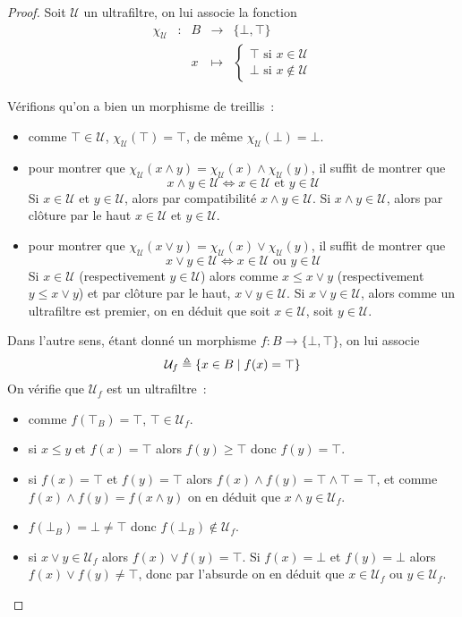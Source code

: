 \begin{proof}
  Soit $\mathcal U$ un ultrafiltre, on lui associe la fonction
  \[\begin{array}{ccccc}
  \chi_{\mathcal U} & : & B & \longrightarrow & \{\bot,\top\}\\
  & & x &\longmapsto& \begin{cases}
    \top\text{ si } x\in \mathcal U\\
    \bot\text{ si } x\notin\mathcal U
  \end{cases}
  \end{array}\]

  Vérifions qu'on a bien un morphisme de treillis~:
  \begin{itemize}
  \item comme $\top\in\mathcal U$, $\chi_\mathcal U(\top) = \top$, de même
    $\chi_\mathcal U(\bot) = \bot$.
  \item pour montrer que
    $\chi_\mathcal U(x\land y) = \chi_\mathcal U(x)\land\chi_\mathcal U(y)$, il
    suffit de montrer que
    \[x\land y \in \mathcal U \iff x\in\mathcal U \text{ et }y\in\mathcal U\]
    Si $x\in \mathcal U$ et $y\in\mathcal U$, alors par compatibilité
    $x\land y \in \mathcal U$. Si $x\land y \in \mathcal U$, alors par clôture
    par le haut $x\in \mathcal U$ et $y\in \mathcal U$.
  \item pour montrer que
    $\chi_\mathcal U(x\lor y) = \chi_\mathcal U(x)\lor\chi_\mathcal U(y)$, il
    suffit de montrer que
    \[x\lor y \in \mathcal U \iff x\in\mathcal U \text{ ou }y\in\mathcal U\]
    Si $x\in \mathcal U$ (respectivement $y\in \mathcal U$) alors comme
    $x\leq x\lor y$ (respectivement $y\leq x\lor y$) et par clôture par le haut,
    $x\lor y \in \mathcal U$. Si $x\lor y \in \mathcal U$, alors comme un
    ultrafiltre est premier, on en déduit que soit $x\in\mathcal U$, soit
    $y\in \mathcal U$.
  \end{itemize}

  Dans l'autre sens, étant donné un morphisme $f : B \to \{\bot,\top\}$, on lui
  associe
  \[\mathcal U_f \triangleq \{x\in B \mid f(x) = \top\}\]
  On vérifie que $\mathcal U_f$ est un ultrafiltre~:
  \begin{itemize}
  \item comme $f(\top_B) = \top$, $\top\in \mathcal U_f$.
  \item si $x\leq y$ et $f(x)=\top$ alors $f(y)\geq \top$ donc $f(y)=\top$.
  \item si $f(x) = \top$ et $f(y)=\top$ alors
    $f(x)\land f(y) = \top\land\top =\top$, et comme
    $f(x)\land f(y)=f(x\land y)$ on en déduit que $x\land y \in \mathcal U_f$.
  \item $f(\bot_B)=\bot\neq\top$ donc $f(\bot_B)\notin\mathcal U_f$.
  \item si $x\lor y \in \mathcal U_f$ alors $f(x)\lor f(y) = \top$. Si
    $f(x) = \bot$ et $f(y) = \bot$ alors $f(x)\lor f(y) \neq \top$, donc par
    l'absurde on en déduit que $x\in \mathcal U_f$ ou $y\in \mathcal U_f$.
  \end{itemize}


\end{proof}
